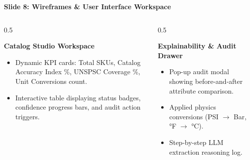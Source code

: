 \documentclass[aspectratio=169, 10pt]{beamer}
\begin{document}
\begin{frame}{\textbf{Slide 8: Wireframes \& User Interface Workspace}}
  \begin{columns}
    \begin{column}{0.5\textwidth}
      \begin{block}{\textbf{Catalog Studio Workspace}}
        \begin{itemize}
          \item Dynamic KPI cards: Total SKUs, Catalog Accuracy Index \%, UNSPSC Coverage \%, Unit Conversions count.
          \item Interactive table displaying status badges, confidence progress bars, and audit action triggers.
        \end{itemize}
      \end{block}
    \end{column}

    \begin{column}{0.5\textwidth}
      \begin{block}{\textbf{Explainability \& Audit Drawer}}
        \begin{itemize}
          \item Pop-up audit modal showing before-and-after attribute comparison.
          \item Applied physics conversions (PSI $\rightarrow$ Bar, °F $\rightarrow$ °C).
          \item Step-by-step LLM extraction reasoning log.
        \end{itemize}
      \end{block}
    \end{column}
  \end{columns}
\end{frame}
\end{document}
